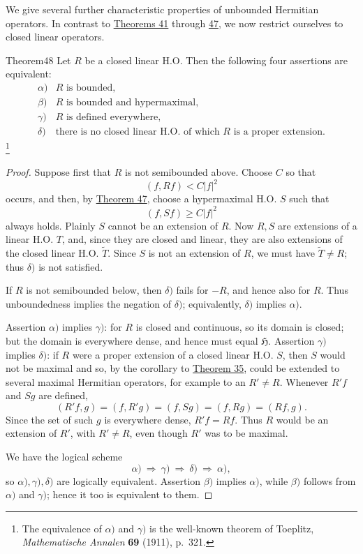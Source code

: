 ﻿\documentclass[paper=b5,fontsize=13pt,bookmarkpackage=false,twoside]{scrartcl}
\begin{document}
We give several further characteristic properties of unbounded Hermitian operators. In contrast to \hyperref[thm:41]{Theorems 41} through \hyperref[thm:47]{47}, we now restrict ourselves to closed linear operators.

\begin{namedstatement}{Theorem}{48}\label{thm:48}
Let $R$ be a closed linear H.O. Then the following four assertions are equivalent:
\[
\begin{array}{ll}
\alpha)&R\text{ is bounded},\\
\beta)&R\text{ is bounded and hypermaximal},\\
\gamma)&R\text{ is defined everywhere},\\
\delta)&\text{there is no closed linear H.O. of which }R
\text{ is a proper extension}.
\end{array}
\]\footnote{\label{fn:61}The equivalence of $\alpha)$ and $\gamma)$ is the well-known theorem of Toeplitz, \emph{Mathematische Annalen} \textbf{69} (1911), p.~321.}
\end{namedstatement}

\begin{proof}
Suppose first that $R$ is not semibounded above. Choose $C$ so that
\[
(f,Rf)<C|f|^2
\]
occurs, and then, by \hyperref[thm:47]{Theorem 47}, choose a hypermaximal H.O. $S$ such that
\[
(f,Sf)\ge C|f|^2
\]
always holds. Plainly $S$ cannot be an extension of $R$. Now $R,S$ are extensions of a linear H.O. $T$, and, since they are closed and linear, they are also extensions of the closed linear H.O. $\widetilde T$. Since $S$ is not an extension of $R$, we must have $\widetilde T\ne R$; thus $\delta)$ is not satisfied.

If $R$ is not semibounded below, then $\delta)$ fails for $-R$, and hence also for $R$. Thus unboundedness implies the negation of $\delta)$; equivalently, $\delta)$ implies $\alpha)$.

Assertion $\alpha)$ implies $\gamma)$: for $R$ is closed and continuous, so its domain is closed; but the domain is everywhere dense, and hence must equal $\mathfrak H$. Assertion $\gamma)$ implies $\delta)$: if $R$ were a proper extension of a closed linear H.O. $S$, then $S$ would not be maximal and so, by the corollary to \hyperref[thm:35]{Theorem 35}, could be extended to several maximal Hermitian operators, for example to an $R'\ne R$. Whenever $R'f$ and $Sg$ are defined,
\[
(R'f,g)=(f,R'g)=(f,Sg)=(f,Rg)=(Rf,g).
\]
Since the set of such $g$ is everywhere dense, $R'f=Rf$. Thus $R$ would be an extension of $R'$, with $R'\ne R$, even though $R'$ was to be maximal.

We have the logical scheme
\[
\alpha)\ \Longrightarrow\ \gamma)\ \Longrightarrow\ \delta)\
\Longrightarrow\ \alpha),
\]
so $\alpha),\gamma),\delta)$ are logically equivalent. Assertion $\beta)$ implies $\alpha)$, while $\beta)$ follows from $\alpha)$ and $\gamma)$; hence it too is equivalent to them.
\end{proof}
\end{document}
